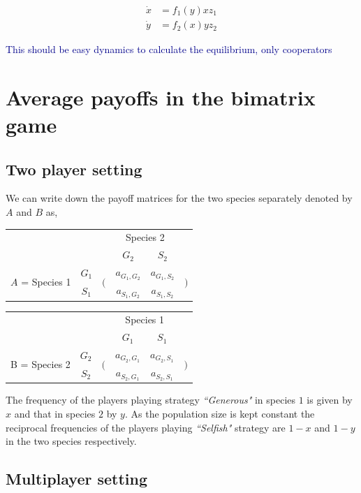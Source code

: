 \documentclass{pnastwo}
\newcommand{\cha}[1]{\textcolor{darkblue}{#1}}
\begin{document}
\begin{article}
\begin{align}
	\dot{x} &= f_{1}(y) x z_1 \\
	\dot{y} &= f_{2}(x) y z_2
\end{align}

\cha{This should be easy dynamics to calculate the equilibrium, only cooperators}

\section*{Average payoffs in the bimatrix game}
\label{appA}
\subsection{Two player setting}

We can write down the payoff matrices for the two species separately  denoted by $A$ and $B$ as,
\begin{tabular}{cccccc}
& & & \multicolumn{2}{c}{Species 2} &\\
& & & $G_2$ & $S_2$ &\\
\multirow{2}{*}{$A$ = Species 1}& $G_1$
& \multirow{2}{*}{$\bigg($} & $a_{G_1,G_2}$ & $a_{G_1,S_2}$ & \multirow{2}{*}{$\bigg)$}\\
& $S_1$ & & $a_{S_1,G_2}$ & $a_{S_1,S_2}$ &
\end{tabular}
\begin{tabular}{cccccc}
& & & \multicolumn{2}{c}{Species 1} &\\
& & & $G_1$ & $S_1$ &\\
\multirow{2}{*}{B = Species 2}& $G_2$
& \multirow{2}{*}{$\bigg($} & $a_{G_2,G_1}$ & $a_{G_2,S_1}$ & \multirow{2}{*}{$\bigg)$}\\
& $S_2$ & & $a_{S_2,G_1}$ & $a_{S_2,S_1}$ &\ \ .
\end{tabular}
The frequency of the players playing strategy \textit{``Generous"} in species $1$ is given by $x$ and that in species $2$ by $y$.
As the population size is kept constant the reciprocal frequencies of the players playing \textit{``Selfish"} strategy are $1-x$ and $1-y$ in the two species respectively.

\subsection{Multiplayer setting}
\label{appB}


\end{article}
\end{document}
